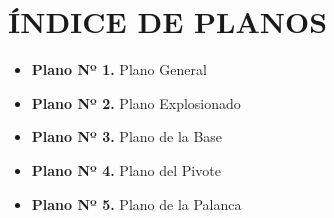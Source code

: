 \documentclass[11pt,a4paper]{article}
\begin{document}
\section*{ÍNDICE DE PLANOS}
\vspace{0.6cm}

\begin{itemize}[label={}, leftmargin=0.5cm, itemsep=0.8em]
    \item \textbf{Plano Nº 1.} Plano General 
    \item \textbf{Plano Nº 2.} Plano Explosionado
    \item \textbf{Plano Nº 3.} Plano de la Base 
    \item \textbf{Plano Nº 4.} Plano del Pivote 
    \item \textbf{Plano Nº 5.} Plano de la Palanca
\end{itemize}

\vspace{2.5cm}
\end{document}
